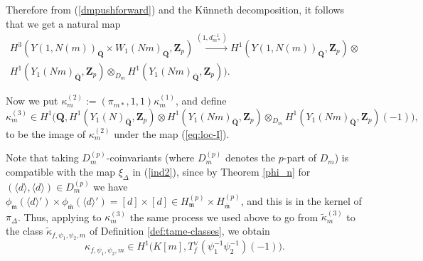 \documentclass[10pt,letterpaper]{amsart}
\theoremstyle{plain}
\theoremstyle{definition}
\theoremstyle{definition}
\theoremstyle{plain}
\theoremstyle{plain}
\theoremstyle{plain}
\theoremstyle{remark}
\numberwithin{equation}{section}
\newcommand{\fkm}{\mathfrak{m}}
\newcommand{\fkmbar}{\overline{\mathfrak{m}}}
\DeclareMathOperator{\et}{\acute{e}t}
\newcommand{\Q}{\mathbf{Q}}
\newcommand{\Z}{\mathbf{Z}}
\begin{document}
Therefore from (\ref{dmpushforward}) and the K\"unneth decomposition, it follows that we get a natural map
\begin{multline}\label{eq:loc-I}
     H^3_{\et}(Y(1,N(m))_{\overline{\Q}}\times W_1(Nm)_{\overline{\Q}},\Z_p) \xrightarrow{(1,d_{m*}^{-1})} H^1_{\et}(Y(1,N(m))_{\overline{\Q}},\Z_p)\otimes \\ H^1_{\et}( Y_1(Nm)_{\overline{\Q}},\Z_p)\otimes_{D_m} H^1_{\et}(Y_1(Nm)_{\overline{\Q}},\Z_p)).
\end{multline} 



Now we put $\kappa_m^{(2)}:=(\pi_{m*},1,1)\kappa_m^{(1)}$, and define
\[
\kappa_m^{(3)}\in H^1\bigl(\Q,H^1_{\et}(Y_1(N)_{\overline{\Q}},\Z_p)\otimes  H^1_{\et}( Y_1(Nm)_{\overline{\Q}},\Z_p)\otimes_{D_m} H^1_{\et}(Y_1(Nm)_{\overline{\Q}},\Z_p)(-1)\bigr),
\]
to be the image of $\kappa_m^{(2)}$ under the map (\ref{eq:loc-I}). 

Note that taking $D_m^{(p)}$-coinvariants (where $D_m^{(p)}$ denotes the $p$-part of $D_m$) is compatible with the map $\xi_\Delta$ in (\ref{ind2}), since 
by Theorem \ref{phi_n}  
for $(\langle d\rangle,\langle d\rangle)\in D_m^{(p)}$ we have $\phi_{\fkm}(\langle d\rangle ')\times\phi_{\fkmbar}(\langle d\rangle ')=[d]\times[d]\in H_{\fkm}^{(p)}\times H_{\fkmbar}^{(p)}$, and this is in the kernel of $\pi_\Delta$. %
Thus, applying to $\kappa_m^{(3)}$ the same process we used above to go from $\tilde{\kappa}_m^{(3)}$ to the class $\tilde{\kappa}_{f,\psi_1,\psi_2,m}$ of Definition \ref{def:tame-classes}, we obtain  
\[
{\kappa}_{f,\psi_1,\psi_2,m}\in H^1\bigl(K[m],T_f^{\vee}(\psi_{1}^{-1}\psi_2^{-1})(-1)\bigr).
\]


\end{document}

